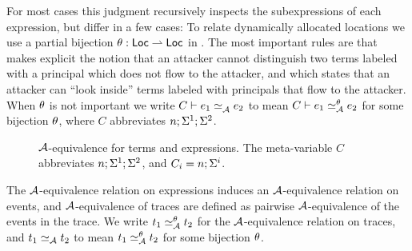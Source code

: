 For most cases this judgment recursively inspects the subexpressions of each expression, but differ in a few cases: To relate dynamically allocated locations we use a partial bijection \cite{Banerjee:2002:SIF:794201.795164, Rajani2018} $\theta: \mathsf{Loc} \rightharpoonup \mathsf{Loc}$ in . The most important rules are  that makes explicit the notion that an attacker cannot distinguish two terms labeled with a principal which does not flow to the attacker, and  which states that an attacker can ``look inside'' terms labeled with principals that flow to the attacker. When $\theta$ is not important we write $\loweq{C}{\Attacker}{\expr_1}{\expr_2}$ to mean $\loweq{C}{\Attacker}[\bijection]{\expr_1}{\expr_2}$ for some bijection $\theta$, where $C$ abbreviates $n; \Sigma^1; \Sigma^2$.

\begin{figure}
    \centering
    \caption{$\mathcal{A}$-equivalence for terms and expressions. The meta-variable $C$ abbreviates $n; \Sigma^1; \Sigma^2$, and $C_i = n; \Sigma^i$.}
    \label{fig:low-eq-expr}
\end{figure}

The $\mathcal{A}$-equivalence relation on expressions induces an $\mathcal{A}$-equivalence relation on events, and $\mathcal{A}$-equivalence of traces are defined as pairwise $\mathcal{A}$-equivalence of the events in the trace. We write $t_1 \simeq_{\mathcal{A}}^{\theta} t_2$ for the $\mathcal{A}$-equivalence relation on traces, and $t_1 \simeq_{\mathcal{A}} t_2$ to mean $t_1 \simeq_{\mathcal{A}}^{\theta} t_2$ for some bijection $\theta$.

